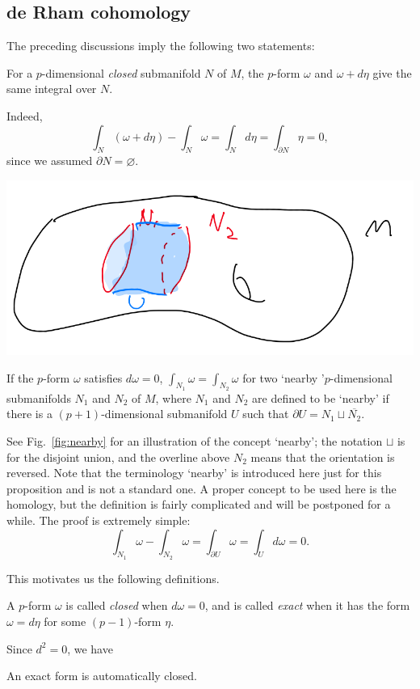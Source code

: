 \documentclass[12pt]{article}
\numberwithin{equation}{section}
\numberwithin{figure}{section}
\theoremstyle{remark}
\renewenvironment{figure}[1][]{
  \begin{originalfigure}[#1]
    \begin{mdframed}[linecolor=black!0,backgroundcolor=black!1]
}{
    \end{mdframed}
  \end{originalfigure}
}
\begin{document}
\subsection{de Rham cohomology}

The preceding discussions imply the following two statements:
\begin{proposition}
For a $p$-dimensional \emph{closed} submanifold $N$ of $M$,
the $p$-form $\omega$ and $\omega+d\eta$ give the same integral over $N$.
\end{proposition}
Indeed, \begin{equation}
  \int_N (\omega+d\eta)-\int_N \omega=\int_N d\eta=\int_{\partial N} \eta=0,
\end{equation}
since we assumed $\partial N=\varnothing$.

\begin{figure}[h]
  \centering
  \includegraphics[width=.5\textwidth]{nearby.png}
  \caption{Two `nearby' submanifolds $N_1$ and $N_2$ within $M$.}
  \label{fig:nearby}
  \end{figure}
  
\begin{proposition}
  If the $p$-form $\omega$ satisfies $d\omega=0$,
  $\int_{N_1} \omega = \int_{N_2} \omega$ for two `nearby '$p$-dimensional  submanifolds $N_1$ and $N_2$ of $M$, 
  where $N_1$ and $N_2$ are defined to be `nearby' 
  if there is a $(p+1)$-dimensional submanifold $U$ such that $\partial U = N_1\sqcup \overline{N_2}$.
\end{proposition}
See Fig.~\ref{fig:nearby} for an illustration of the concept `nearby';
the notation $\sqcup$ is for the disjoint union,
and the overline above $N_2$ means that the orientation is reversed. 
Note that the terminology `nearby' is introduced here just for this proposition
and is not a standard one.
A proper concept to be used here is the homology, but the definition is fairly complicated and will be postponed for a while.
The proof is extremely simple: \begin{equation}
\int_{N_1} \omega - \int_{N_2} \omega = \int_{\partial U}\omega=\int_U d\omega = 0.
\end{equation}

This motivates us the following definitions.
\begin{definition}
A $p$-form $\omega$ is called \emph{closed} when $d\omega=0$,
and is called \emph{exact} when it has the form $\omega=d\eta$ for some $(p-1)$-form $\eta$.
\end{definition}
Since $d^2=0$, we have
\begin{proposition}
An exact form is automatically closed.
\end{proposition}
\end{document}
